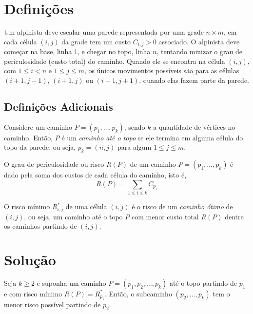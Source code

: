\section{Definições}

Um alpinista deve escalar uma parede representada por uma grade $n \times m$, em cada célula $(i, j)$ da grade tem um custo $C_{i, j} > 0$ associado. O alpinista deve começar na base, linha 1, e chegar no topo, linha $n$, tentando minizar o grau de periculosidade (custo total) do caminho. Quando ele se encontra na célula $(i, j)$, com $1 \leq i < n$ e $1 \leq j \leq m$, os únicos movimentos possíveis são para as células $(i+1, j-1)$, $(i+1, j)$ ou $(i+1, j+1)$, quando elas fazem parte da parede.

\subsection{Definições Adicionais}

\begin{definition}
    Considere um caminho $P = \left(p_1, \ldots, p_k\right)$, sendo $k$ a quantidade de vértices no caminho. Então, $P$ é um \textit{caminho até o topo} se ele termina em alguma célula do topo da parede, ou seja, $p_k = (n, j)$ para algum $1 \leq j \leq m$.
\end{definition}

\begin{definition}[Risco]
    O grau de periculosidade ou risco $R(P)$ de um caminho $P = \left(p_1, \ldots, p_k\right)$ é dado pela soma dos custos de cada célula do caminho, isto é,
    \[
        R(P) = \sum_{1 \leq i \leq k} C_{p_i}
    \]
\end{definition}

\begin{definition}
    O risco mínimo $R^*_{i, j}$ de uma célula $(i, j)$ é o risco de um \textit{caminho ótimo} de $(i, j)$, ou seja, um caminho até o topo $P$ com menor custo total $R(P)$ dentre os caminhos partindo de $(i, j)$.
\end{definition}

\section{Solução}

\begin{theorem}
    Seja $k \geq 2$ e suponha um caminho $P = \left(p_1, p_2, \ldots, p_k\right)$ até o topo partindo de $p_1$ e com risco mínimo $R(P) = R^*_{p_1}$. Então, o subcaminho $\left(p_2, \ldots, p_k\right)$ tem o menor risco possível partindo de $p_2$.
\end{theorem}

